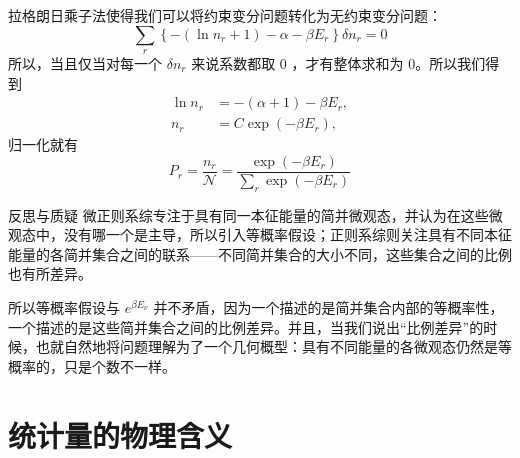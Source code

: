 拉格朗日乘子法使得我们可以将约束变分问题转化为无约束变分问题：
\begin{equation}\label{equ:variational}
    \sum_r\left\{-\left(\ln n_r+1\right)-\alpha-\beta E_r\right\} \delta n_r=0
\end{equation}
所以，当且仅当对每一个 $\delta n_r$ 来说系数都取 $0$ ，才有整体求和为 $0$。所以我们得到
\begin{equation}
        \begin{aligned}
            \ln n_r&=-(\alpha+1)-\beta E_r,\\
            n_r&=C \exp \left(-\beta E_r\right),
            \end{aligned}
\end{equation}
归一化就有
\begin{equation}\label{equ:canonicalprobability}
    P_r = \frac{n_r}{\mathcal{N}}=\frac{\exp \left(-\beta E_r\right)}{\sum_r \exp \left(-\beta E_r\right)}
\end{equation}

\begin{justification}{\kaishu 反思与质疑}
\kaishu \fontsize{11pt}{16pt}
    \quad\quad 微正则系综专注于具有同一本征能量的简并微观态，并认为在这些微观态中，没有哪一个是主导，所以引入等概率假设；正则系综则关注具有不同本征能量的各简并集合之间的联系——不同简并集合的大小不同，这些集合之间的比例也有所差异。

    \quad\quad 所以等概率假设与 $e^{\beta E_\nu}$ 并不矛盾，因为一个描述的是简并集合内部的等概率性，一个描述的是这些简并集合之间的比例差异。并且，当我们说出“比例差异”的时候，也就自然地将问题理解为了一个几何概型：具有不同能量的各微观态仍然是等概率的，只是个数不一样。
\end{justification}

\section{统计量的物理含义}\label{sec:统计量的物理含义}

